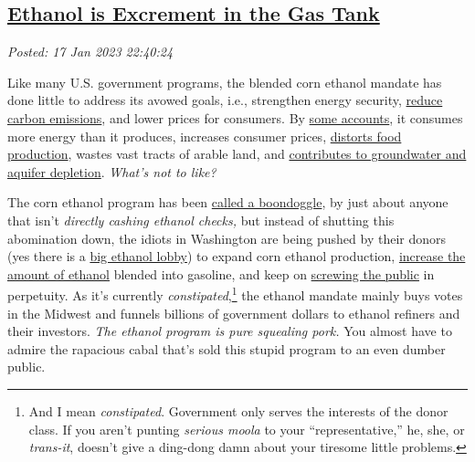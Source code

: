%

\subsection*{\href{https://analyzethedatanotthedrivel.org/2023/01/17/ethanol-is-excrement-in-the-gas-tank/}{Ethanol is Excrement in the Gas Tank}}


\noindent\emph{Posted: 17 Jan 2023 22:40:24}
\vspace{6pt}


Like many U.S. government programs, the blended corn ethanol mandate has
done little to address its avowed goals, i.e., strengthen energy
security,
\href{https://www.factcheck.org/2015/11/ethanol-higher-emissions-or-lower/}{reduce
carbon emissions}, and lower prices for consumers. By
\href{http://large.stanford.edu/courses/2011/ph240/sojka2/}{some
accounts}, it consumes more energy than it produces, increases consumer
prices,
\href{https://www.ucsusa.org/resources/land-use-changes-and-biofuels}{distorts
food production}, wastes vast tracts of arable land, and
\href{https://news.climate.columbia.edu/2011/03/21/ethanol\%E2\%80\%99s-impacts-on-our-water-resources/}{contributes
to groundwater and aquifer depletion}. \emph{What's not to like?}

The corn ethanol program has been
\href{https://the-pipeline.org/the-great-ethanol-boondoggle/}{called a
boondoggle}, by just about anyone that isn't \emph{directly cashing
ethanol checks,} but instead of shutting this abomination down, the
idiots in Washington are being pushed by their donors (yes there is a
\href{https://www.bloomberg.com/news/articles/2021-11-16/ethanol-lobby-to-white-house-blend-rule-rollback-would-backfire\#xj4y7vzkg}{big
ethanol lobby}) to expand corn ethanol production,
\href{https://www.popularmechanics.com/cars/hybrid-electric/a11687/four-things-to-know-about-e15-15096134/}{increase
the amount of ethanol} blended into gasoline, and keep on \href{https://www.forbes.com/sites/dianafurchtgott-roth/2022/12/02/higher-ethanol-mandates-are-a-lose-lose-for-americans/?sh=331fc2e05c8d}{screwing the public} in perpetuity. As it's currently \emph{constipated},\footnote{And
  I mean \emph{constipated}. Government only serves the interests of the
  donor class. If you aren't punting \emph{serious moola} to your
  ``representative,'' he, she, or \emph{trans-it}, doesn't give a
  ding-dong damn about your tiresome little problems.} the ethanol
mandate mainly buys votes in the Midwest and funnels billions of
government dollars to ethanol refiners and their investors. \emph{The
ethanol program is pure squealing pork.} You almost have to admire
the rapacious cabal that's sold this stupid program to an even dumber
public.

